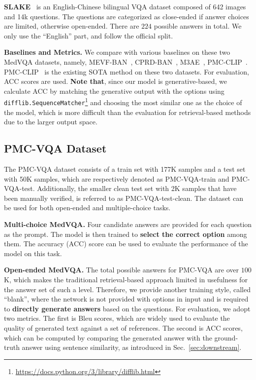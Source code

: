 \documentclass{article}
\begin{document}
\noindent \textbf{SLAKE}~\cite{liu2021slake} is an English-Chinese bilingual VQA dataset composed of 642 images and 14k questions.
The questions are categorized as close-ended if answer choices are limited, otherwise open-ended.
There are $224$ possible answers in total.
We only use the ``English'' part, and follow the official split.


\noindent \textbf{Baselines and Metrics.} We compare with various baselines on these two MedVQA datasets, namely, MEVF-BAN~\cite{nguyen2019overcoming}, CPRD-BAN~\cite{liu2021contrastive}, M3AE~\cite{chen2022multi}, PMC-CLIP~\cite{lin2023pmcclip}. PMC-CLIP~\cite{lin2023pmcclip} is the existing SOTA method on these two datasets. For evaluation, ACC scores are used. \textbf{Note that}, since our model is generative-based, we calculate ACC by matching the generative output with the options using \texttt{difflib.SequenceMatcher}\footnote{\url{https://docs.python.org/3/library/difflib.html}} and choosing the most similar one as the choice of the model, which is more difficult than the evaluation for retrieval-based methods due to the larger output space.

\subsection{PMC-VQA Dataset}
\label{sec:benchmark}

The PMC-VQA dataset consists of a train set with 177K samples and a test set with 50K samples, which are respectively denoted as PMC-VQA-train and PMC-VQA-test. 
Additionally, the smaller clean test set with 2K samples that have been manually verified, is referred to as PMC-VQA-test-clean. 
The dataset can be used for both open-ended and multiple-choice tasks. 


\noindent \textbf{Multi-choice MedVQA. } 
Four candidate answers are provided for each question as the prompt.
The model is then trained to \textbf{select the correct option} among them. The accuracy (ACC) score can be used to evaluate the performance of the model on this task.

\noindent \textbf{Open-ended MedVQA. } 
The total possible answers for PMC-VQA are over $100$K, 
which makes the traditional retrieval-based approach limited in usefulness for the answer set of such a level. Therefore, we provide another training style, called ``blank'', 
where the network is not provided with options in input and is required to \textbf{directly generate answers} based on the questions.
For evaluation, we adopt two metrics. The first is Bleu scores, 
which are widely used to evaluate the quality of generated text against a set of references. The second is ACC scores, which can be computed by comparing the generated answer with the ground-truth answer using sentence similarity, as introduced in Sec.~\ref{sec:downstream}.
\end{document}
